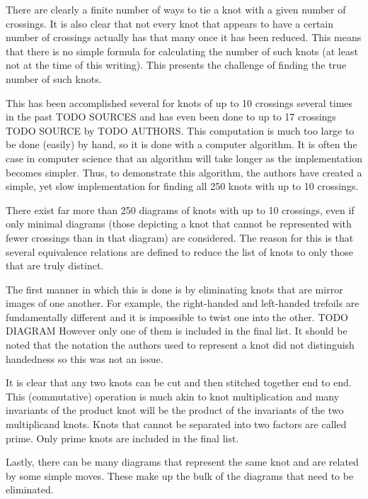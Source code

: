 \begin{paper}

There are clearly a finite number of ways to tie a knot with a given number of
crossings.
It is also clear that not every knot that appears to have a certain number of
crossings actually has that many once it has been reduced.
This means that there is no simple formula for calculating the number of such
knots (at least not at the time of this writing).
This presents the challenge of finding the true number of such knots.

This has been accomplished several for knots of up to 10 crossings several times
in the past TODO SOURCES and has even been done to up to 17 crossings TODO
SOURCE by TODO AUTHORS.
This computation is much too large to be done (easily) by hand, so it is done
with a computer algorithm.
It is often the case in computer science that an algorithm will take longer as
the implementation becomes simpler.
Thus, to demonstrate this algorithm, the authors have created a simple, yet slow
implementation for finding all 250 knots with up to 10 crossings.

There exist far more than 250 diagrams of knots with up to 10 crossings, even if
only minimal diagrams (those depicting a knot that cannot be represented with
fewer crossings than in that diagram) are considered.
The reason for this is that several equivalence relations are defined to reduce
the list of knots to only those that are truly distinct.

The first manner in which this is done is by eliminating knots that are mirror
images of one another.
For example, the right-handed and left-handed trefoils are fundamentally
different and it is impossible to twist one into the other. TODO DIAGRAM
However only one of them is included in the final list.
It should be noted that the notation the authors used to represent a knot did
not distinguish handedness so this was not an issue.

It is clear that any two knots can be cut and then stitched together end to end.
This (commutative) operation is much akin to knot multiplication and many
invariants of the product knot will be the product of the invariants of the two
multiplicand knots.
Knots that cannot be separated into two factors are called prime.
Only prime knots are included in the final list.

Lastly, there can be many diagrams that represent the same knot and are related
by some simple moves.
These make up the bulk of the diagrams that need to be eliminated.


\end{paper}

